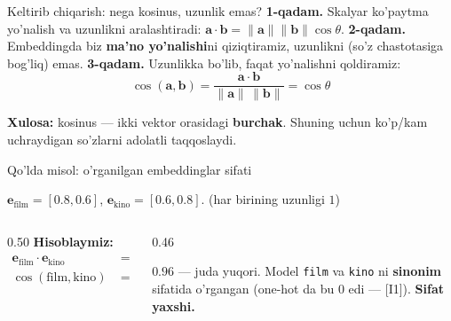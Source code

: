 \documentclass[aspectratio=169,11pt]{beamer}
\begin{document}
\begin{frame}{Keltirib chiqarish: nega kosinus, uzunlik emas?}
  \textbf{1-qadam.} Skalyar ko'paytma yo'nalish va uzunlikni aralashtiradi:
  $\mathbf{a}\cdot\mathbf{b} = \|\mathbf{a}\|\|\mathbf{b}\|\cos\theta$.
  \pause
  \textbf{2-qadam.} Embeddingda biz \textbf{ma'no yo'nalishi}ni qiziqtiramiz,
  uzunlikni (so'z chastotasiga bog'liq) emas.
  \pause
  \textbf{3-qadam.} Uzunlikka bo'lib, faqat yo'nalishni qoldiramiz:
  $$ \cos(\mathbf{a},\mathbf{b}) = \frac{\mathbf{a}\cdot\mathbf{b}}
     {\|\mathbf{a}\|\,\|\mathbf{b}\|} = \cos\theta $$
  \begin{tcolorbox}[okbox,top=2pt,bottom=2pt]
    \small \textbf{Xulosa:} kosinus --- ikki vektor orasidagi \textbf{burchak}.
    Shuning uchun ko'p/kam uchraydigan so'zlarni adolatli taqqoslaydi.
  \end{tcolorbox}
\end{frame}

\begin{frame}{Qo'lda misol: o'rganilgan embeddinglar sifati}
  \begin{tcolorbox}[defbox,title={O'qitishdan keyingi vektorlar (dim=2)}]
    \small
    $\mathbf{e}_{\text{film}}=[0.8,0.6]$, \quad
    $\mathbf{e}_{\text{kino}}=[0.6,0.8]$. \quad (har birining uzunligi $1$)
  \end{tcolorbox}
  \vspace{0.2em}
  \begin{columns}[T]
    \begin{column}{0.50\textwidth}
      \textbf{Hisoblaymiz:}
      \begin{align*}
        \mathbf{e}_{\text{film}}\cdot\mathbf{e}_{\text{kino}}
          &= 0.8{\cdot}0.6 + 0.6{\cdot}0.8 = 0.96\\
        \cos(\text{film},\text{kino}) &= \frac{0.96}{1\cdot 1} = \mathbf{0.96}
      \end{align*}
    \end{column}
    \begin{column}{0.46\textwidth}
      \begin{tcolorbox}[okbox,top=2pt,bottom=2pt]
        \footnotesize
        $0.96$ --- juda yuqori. Model \texttt{film} va \texttt{kino} ni
        \textbf{sinonim} sifatida o'rgangan (one-hot da bu $0$ edi --- [I1]).
        \textbf{Sifat yaxshi.}
      \end{tcolorbox}
    \end{column}
  \end{columns}
\end{frame}
\end{document}
